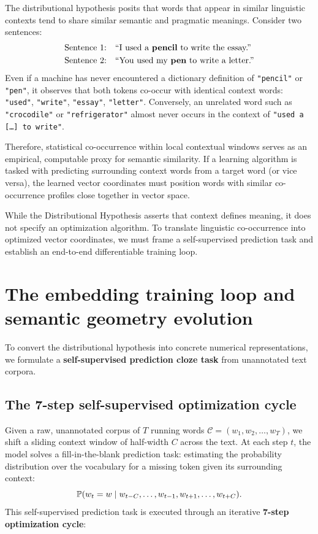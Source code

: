 \documentclass[../../main.tex]{subfiles}
\begin{document}
The distributional hypothesis posits that words that appear in similar linguistic contexts tend to share similar semantic and pragmatic meanings. Consider two sentences:
\begin{align*}
\text{Sentence 1:} \quad &\text{``I used a \textbf{pencil} to write the essay.''} \\
\text{Sentence 2:} \quad &\text{``You used my \textbf{pen} to write a letter.''}
\end{align*}
Even if a machine has never encountered a dictionary definition of \texttt{"pencil"} or \texttt{"pen"}, it observes that both tokens co-occur with identical context words: \texttt{"used"}, \texttt{"write"}, \texttt{"essay"}, \texttt{"letter"}. Conversely, an unrelated word such as \texttt{"crocodile"} or \texttt{"refrigerator"} almost never occurs in the context of \texttt{"used a [\dots] to write"}.

Therefore, statistical co-occurrence within local contextual windows serves as an empirical, computable proxy for semantic similarity. If a learning algorithm is tasked with predicting surrounding context words from a target word (or vice versa), the learned vector coordinates must position words with similar co-occurrence profiles close together in vector space.

While the Distributional Hypothesis asserts that context defines meaning, it does not specify an optimization algorithm. To translate linguistic co-occurrence into optimized vector coordinates, we must frame a self-supervised prediction task and establish an end-to-end differentiable training loop.

\clearpage
\section{The embedding training loop and semantic geometry evolution}
\label{sec:embedding_training_loop}

To convert the distributional hypothesis into concrete numerical representations, we formulate a \textbf{self-supervised prediction cloze task} from unannotated text corpora.

\subsection{The 7-step self-supervised optimization cycle}
\label{subsec:seven_step_loop}

Given a raw, unannotated corpus of $T$ running words $\mathcal{C} = (w_1, w_2, \dots, w_T)$, we shift a sliding context window of half-width $C$ across the text. At each step $t$, the model solves a fill-in-the-blank prediction task: estimating the probability distribution over the vocabulary for a missing token given its surrounding context:
\begin{equation}
\label{eq:cloze_task}
\mathbb{P}(w_t = w \mid w_{t-C}, \dots, w_{t-1}, w_{t+1}, \dots, w_{t+C}).
\end{equation}
This self-supervised prediction task is executed through an iterative \textbf{7-step optimization cycle}:
\end{document}
